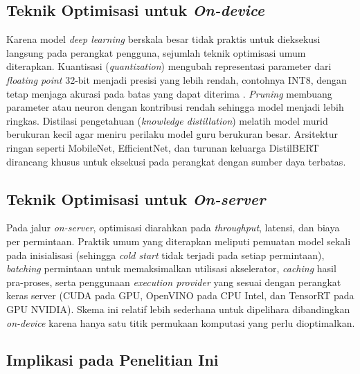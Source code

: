 \subsection{Teknik Optimisasi untuk \textit{On-device}}

Karena model \textit{deep learning} berskala besar tidak praktis untuk dieksekusi langsung pada perangkat pengguna, sejumlah teknik optimisasi umum diterapkan. Kuantisasi (\textit{quantization}) mengubah representasi parameter dari \textit{floating point} 32-bit menjadi presisi yang lebih rendah, contohnya INT8, dengan tetap menjaga akurasi pada batas yang dapat diterima \citep{amorEdgeAIPractice2025,wangEmpoweringEdgeIntelligence2025}. \textit{Pruning} membuang parameter atau neuron dengan kontribusi rendah sehingga model menjadi lebih ringkas. Distilasi pengetahuan (\textit{knowledge distillation}) melatih model murid berukuran kecil agar meniru perilaku model guru berukuran besar. Arsitektur ringan seperti MobileNet, EfficientNet, dan turunan keluarga DistilBERT dirancang khusus untuk eksekusi pada perangkat dengan sumber daya terbatas.

\subsection{Teknik Optimisasi untuk \textit{On-server}}

Pada jalur \textit{on-server}, optimisasi diarahkan pada \textit{throughput}, latensi, dan biaya per permintaan. Praktik umum yang diterapkan meliputi pemuatan model sekali pada inisialisasi (sehingga \textit{cold start} tidak terjadi pada setiap permintaan), \textit{batching} permintaan untuk memaksimalkan utilisasi akselerator, \textit{caching} hasil pra-proses, serta penggunaan \textit{execution provider} yang sesuai dengan perangkat keras server (CUDA pada GPU, OpenVINO pada CPU Intel, dan TensorRT pada GPU NVIDIA). Skema ini relatif lebih sederhana untuk dipelihara dibandingkan \textit{on-device} karena hanya satu titik permukaan komputasi yang perlu dioptimalkan.

\subsection{Implikasi pada Penelitian Ini}

